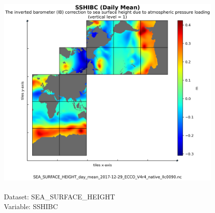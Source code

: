 \begin{figure}[H]
\centering
\includegraphics[scale=0.5]{../images/plots/native_plots/Sea_Surface_Height/SSHIBC.png}
\caption{\\Dataset: SEA\_SURFACE\_HEIGHT\\Variable: SSHIBC}
\label{tab:table-SEA_SURFACE_HEIGHT_SSHIBC-Plot}
\end{figure}
\pagebreak
